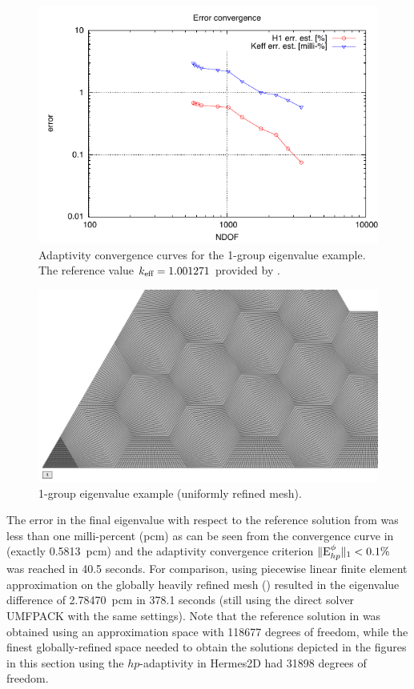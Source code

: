 \begin{figure}[!ht]
\centering
  \includegraphics[scale=1.1]{hex/conv_dof}
  \caption[Adaptivity convergence curves for the 1-group eigenvalue example]{Adaptivity convergence curves for the
  1-group eigenvalue example. The reference value $\keff = 1.001271$ provided by \cite{hebert}.}
  \label{fig:57}
\end{figure}

\begin{figure}[!hb]
\centering
  \includegraphics[scale=.33]{hex/ref.png}
	\caption[1-group eigenvalue example (uniformly refined mesh)]{1-group eigenvalue example (uniformly refined mesh).}
	\label{fig:58}
\end{figure}

The error in the final eigenvalue with respect to the reference solution from \cite{hebert} was less than one
milli-percent (pcm) as can be seen from the convergence curve in  (exactly \SI{0.5813}{pcm}) and the
adaptivity convergence criterion \mbox{$\norm[1]{\Ehp^{\phi}} < 0.1\%$} was reached in 40.5 seconds. For comparison,
using piecewise linear finite element approximation on the globally heavily refined mesh () resulted in the eigenvalue difference of \SI{2.78470}{pcm} in 378.1 seconds (still using the direct solver UMFPACK with the same settings).
Note that the reference solution in \cite{hebert} was obtained using an approximation space with 118677 degrees of
freedom, while the finest globally-refined space needed to obtain the solutions depicted in the figures in this section
using the $hp$-adaptivity in Hermes2D had 31898 degrees of freedom.

